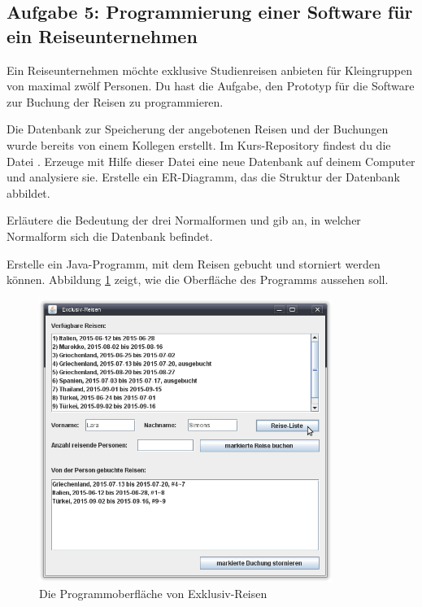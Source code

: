 \subsection{Aufgabe 5: Programmierung einer Software für ein Reiseunternehmen}

Ein Reiseunternehmen möchte exklusive Studienreisen anbieten für Kleingruppen
von maximal zwölf Personen. Du hast die Aufgabe, den Prototyp für die Software
zur Buchung der Reisen zu programmieren.

\begin{compactenum}[a)]
\item Die Datenbank zur Speicherung der angebotenen Reisen und der Buchungen
wurde bereits von einem Kollegen erstellt. Im Kurs-Repository findest du die
Datei . Erzeuge mit Hilfe dieser Datei eine neue
Datenbank auf deinem Computer und analysiere sie. Erstelle ein ER-Diagramm, das
die Struktur der Datenbank abbildet.
\item Erläutere die Bedeutung der drei Normalformen und gib an, in welcher
Normalform sich die Datenbank befindet.
\item Erstelle ein Java-Programm, mit dem Reisen gebucht und storniert werden
 können. Abbildung \ref{fig:exklusivreisen} zeigt, wie die Oberfläche des
 Programms aussehen soll.
 
 \begin{figure}[h]
 \centering
 \includegraphics[width=0.85\textwidth]{./inf/SEKII/38_JavaSQL_Wiederholung/ExklusivReisenAufgabe5.png}
 \caption{Die Programmoberfläche von \glqq Exklusiv-Reisen\grqq}
 \label{fig:exklusivreisen}
 \end{figure}
 

\end{compactenum}
